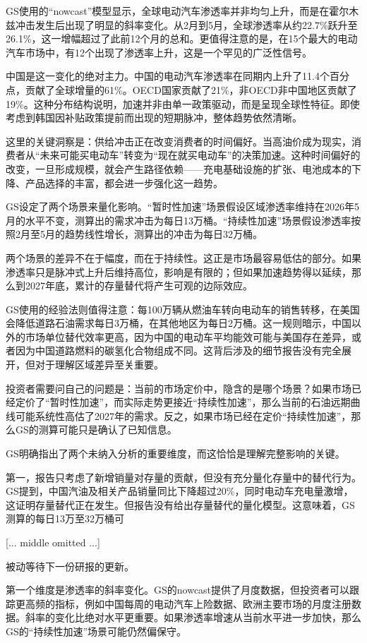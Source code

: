 \documentclass[11pt]{ctexart}
\begin{document}
GS使用的“nowcast”模型显示，全球电动汽车渗透率并非均匀上升，而是在霍尔木兹冲击发生后出现了明显的斜率变化。从2月到5月，全球渗透率从约22.7\%跃升至26.1\%，这一增幅超过了此前12个月的总和。更值得注意的是，在15个最大的电动汽车市场中，有12个出现了渗透率上升，这是一个罕见的广泛性信号。

中国是这一变化的绝对主力。中国的电动汽车渗透率在同期内上升了11.4个百分点，贡献了全球增量的61\%。OECD国家贡献了21\%，非OECD非中国地区贡献了19\%。这种分布结构说明，加速并非由单一政策驱动，而是呈现全球性特征。即使考虑到韩国因补贴政策提前而出现的短期脉冲，整体趋势依然清晰。

这里的关键洞察是：供给冲击正在改变消费者的时间偏好。当高油价成为现实，消费者从“未来可能买电动车”转变为“现在就买电动车”的决策加速。这种时间偏好的改变，一旦形成规模，就会产生路径依赖——充电基础设施的扩张、电池成本的下降、产品选择的丰富，都会进一步强化这一趋势。

GS设定了两个场景来量化影响。“暂时性加速”场景假设区域渗透率维持在2026年5月的水平不变，测算出的需求冲击为每日13万桶。“持续性加速”场景假设渗透率按照2月至5月的趋势线性增长，测算出的冲击为每日32万桶。

两个场景的差异不在于幅度，而在于持续性。这正是市场最容易低估的部分。如果渗透率只是脉冲式上升后维持高位，影响是有限的；但如果加速趋势得以延续，那么到2027年底，累计的存量替代将产生可观的边际效应。

GS使用的经验法则值得注意：每100万辆从燃油车转向电动车的销售转移，在美国会降低道路石油需求每日3万桶，在其他地区为每日2万桶。这一规则暗示，中国以外的市场单位替代效率更高，因为中国的电动车平均能效可能与美国存在差异，或者因为中国道路燃料的碳氢化合物组成不同。这背后涉及的细节报告没有完全展开，但对于理解区域差异至关重要。

投资者需要问自己的问题是：当前的市场定价中，隐含的是哪个场景？如果市场已经定价了“暂时性加速”，而实际走势更接近“持续性加速”，那么当前的石油远期曲线可能系统性高估了2027年的需求。反之，如果市场已经在定价“持续性加速”，那么GS的测算可能只是确认了已知信息。

GS明确指出了两个未纳入分析的重要维度，而这恰恰是理解完整影响的关键。

第一，报告只考虑了新增销量对存量的贡献，但没有充分量化存量中的替代行为。GS提到，中国汽油及相关产品销量同比下降超过20\%，同时电动车充电量激增，这证明存量替代正在发生。但报告没有给出存量替代的量化模型。这意味着，GS测算的每日13万至32万桶可

[... middle omitted ...]

被动等待下一份研报的更新。

第一个维度是渗透率的斜率变化。GS的nowcast提供了月度数据，但投资者可以跟踪更高频的指标，例如中国每周的电动汽车上险数据、欧洲主要市场的月度注册数据。斜率的变化比绝对水平更重要。如果渗透率增速从当前水平进一步加快，那么GS的“持续性加速”场景可能仍然偏保守。
\end{document}
